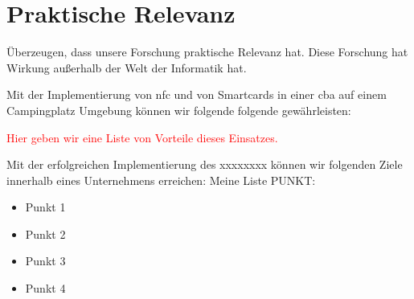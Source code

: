 \section{Praktische Relevanz}

Überzeugen, dass unsere Forschung praktische Relevanz hat. Diese Forschung hat Wirkung außerhalb der
Welt der Informatik hat.

Mit der Implementierung von \acrshort{nfc} und von Smartcards in einer \acrlong{cba} auf einem Campingplatz Umgebung können
wir folgende folgende gewährleisten:

\textcolor{red}{Hier geben wir eine Liste von Vorteile dieses Einsatzes.}


Mit der erfolgreichen Implementierung des xxxxxxxx können wir folgenden Ziele innerhalb eines Unternehmens erreichen:
Meine Liste PUNKT:
\begin{itemize}
    \item Punkt 1
    \item Punkt 2
    \item Punkt 3
    \item Punkt 4
\end{itemize}

